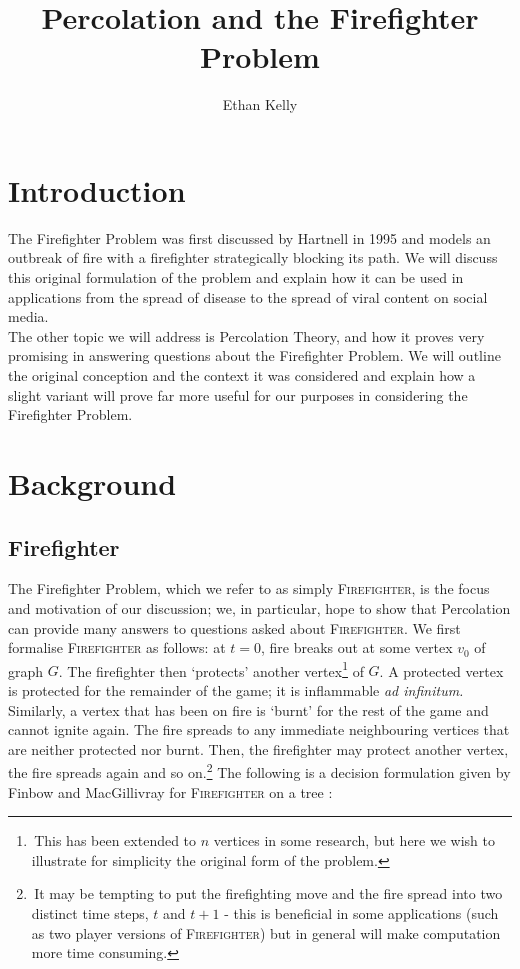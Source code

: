\documentclass[11pt]{amsart}
\title{Percolation and the Firefighter Problem}
\author{Ethan Kelly}
\begin{document}
\maketitle

\section{Introduction}
\label{sec:intro}

The Firefighter Problem was first discussed by Hartnell in 1995 \cite{hartnell95} and models an outbreak of fire with a firefighter strategically blocking its path. We will discuss this original formulation of the problem and explain how it can be used in applications from the spread of disease to the spread of viral content on social media.\\

The other topic we will address is Percolation Theory, and how it proves very promising in answering questions about the Firefighter Problem. We will outline the original conception and the context it was considered and explain how a slight variant will prove far more useful for our purposes in considering the Firefighter Problem.


\section{Background}

\subsection{Firefighter}
\label{sec:fire}

The Firefighter Problem, which we refer to as simply {\scshape Firefighter}, is the focus and motivation of our discussion; we, in particular, hope to show that Percolation can provide many answers to questions asked about {\scshape Firefighter}. We first formalise {\scshape Firefighter} as follows: at $t=0$, fire breaks out at some vertex $v_0$ of graph $G$. The firefighter then `protects' another vertex\footnote{\,This has been extended to $n$ vertices in some research, but here we wish to illustrate for simplicity the original form of the problem.} of $G$. A protected vertex is protected for the remainder of the game; it is inflammable \textit{ad infinitum.} Similarly, a vertex that has been on fire is `burnt' for the rest of the game and cannot ignite again. The fire spreads to any immediate neighbouring vertices that are neither protected nor burnt. Then, the firefighter may protect another vertex, the fire spreads again and so on.\footnote{\,It may be tempting to put the firefighting move and the fire spread into two distinct time steps, $t$ and $t+1$ - this is beneficial in some applications (such as two player versions of {\scshape Firefighter}) but in general will make computation more time consuming.} The following is a decision formulation given by Finbow and MacGillivray for {\scshape Firefighter} on a tree \cite{finbow09}:
\end{document}

